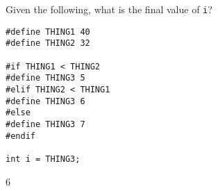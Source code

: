 Given the following, what is the final value of \texttt{i}?
\begin{verbatim}
#define THING1 40
#define THING2 32

#if THING1 < THING2
#define THING3 5
#elif THING2 < THING1
#define THING3 6
#else
#define THING3 7
#endif

int i = THING3;
\end{verbatim}
\begin{answer}
6
\end{answer}